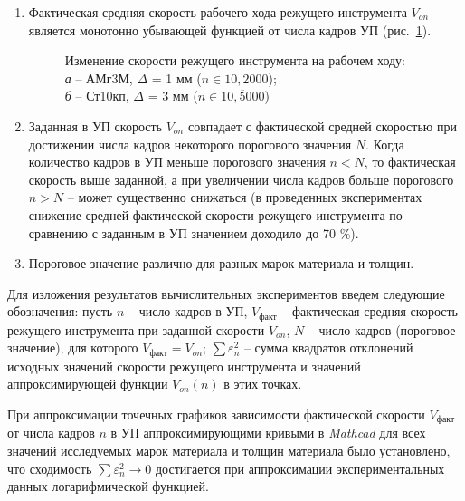 \begin{enumerate}
\item
Фактическая средняя скорость рабочего хода режущего инструмента
$V_{on}$
является монотонно убывающей функцией от числа кадров УП
(рис.~\ref{amg3m+10kp}).

\begin{figure}[p]
  \centering
  \caption{
    Изменение скорости режущего инструмента
    на рабочем ходу: \\
    {\it а} -- АМг3М, $\Delta$ = 1 мм ($n \in \overline{10,2000}$); \\
    {\it б} -- Ст10кп, $\Delta$ = 3 мм ($n \in \overline{10,5000}$)
  }
  \label{amg3m+10kp}
\end{figure}

\item
Заданная в УП скорость
$V_{on}$
совпадает с фактической средней скоростью
при достижении числа кадров некоторого порогового значения $N$.
Когда количество кадров в УП меньше порогового значения $n<N$,
то фактическая скорость выше заданной,
а при увеличении числа кадров больше порогового $n>N$
-- может существенно снижаться
(в проведенных экспериментах снижение средней
фактической скорости режущего инструмента по сравнению
с заданным в УП значением доходило до 70 \%).

\item
Пороговое значение различно для разных марок материала и толщин.

\end{enumerate}

Для изложения результатов вычислительных экспериментов
введем следующие обозначения:
пусть
$n$ -- число кадров в УП,
$V_\text{факт}$ -- фактическая средняя скорость режущего инструмента при заданной скорости $V_{on}$,
$N$ -- число кадров (пороговое значение), для которого $V_\text{факт}=V_{on}$;
$\sum \varepsilon_n^2$ -- сумма квадратов отклонений исходных значений
скорости режущего инструмента и значений аппроксимирующей функции $V_{on}(n)$
в этих точках.

При аппроксимации точечных графиков
зависимости фактической скорости
$V_\text{факт}$
от числа кадров $n$
в УП аппроксимирующими кривыми в
{\it Mathcad}
для всех значений исследуемых марок материала и толщин материала было установлено,
что сходимость
$\sum \varepsilon_n^2 \to 0$
достигается при аппроксимации экспериментальных данных логарифмической функцией.

